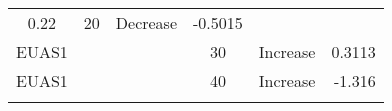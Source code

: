 \documentclass[]{article}
\begin{document}
\begin{longtable}[]{@{}clrccr@{}}
\begin{minipage}[t]{0.11\columnwidth}
0.22\strut
\end{minipage} & \begin{minipage}[t]{0.10\columnwidth}\centering\strut
20\strut
\end{minipage} & \begin{minipage}[t]{0.16\columnwidth}\centering\strut
Decrease\strut
\end{minipage} & \begin{minipage}[t]{0.09\columnwidth}\raggedleft\strut
-0.5015\strut
\end{minipage}\tabularnewline
\begin{minipage}[t]{0.08\columnwidth}\centering\strut
EUAS1\strut
\end{minipage} & \begin{minipage}[t]{0.29\columnwidth}\raggedright\strut
\strut
\end{minipage} & \begin{minipage}[t]{0.11\columnwidth}\raggedleft\strut
\strut
\end{minipage} & \begin{minipage}[t]{0.10\columnwidth}\centering\strut
30\strut
\end{minipage} & \begin{minipage}[t]{0.16\columnwidth}\centering\strut
Increase\strut
\end{minipage} & \begin{minipage}[t]{0.09\columnwidth}\raggedleft\strut
0.3113\strut
\end{minipage}\tabularnewline
\begin{minipage}[t]{0.08\columnwidth}\centering\strut
EUAS1\strut
\end{minipage} & \begin{minipage}[t]{0.29\columnwidth}\raggedright\strut
\strut
\end{minipage} & \begin{minipage}[t]{0.11\columnwidth}\raggedleft\strut
\strut
\end{minipage} & \begin{minipage}[t]{0.10\columnwidth}\centering\strut
40\strut
\end{minipage} & \begin{minipage}[t]{0.16\columnwidth}\centering\strut
Increase\strut
\end{minipage} & \begin{minipage}[t]{0.09\columnwidth}\raggedleft\strut
-1.316\strut
\end{minipage}\tabularnewline
\begin{minipage}[t]{0.08\columnwidth}\centering\strut

\end{minipage}
\end{longtable}
\end{document}
